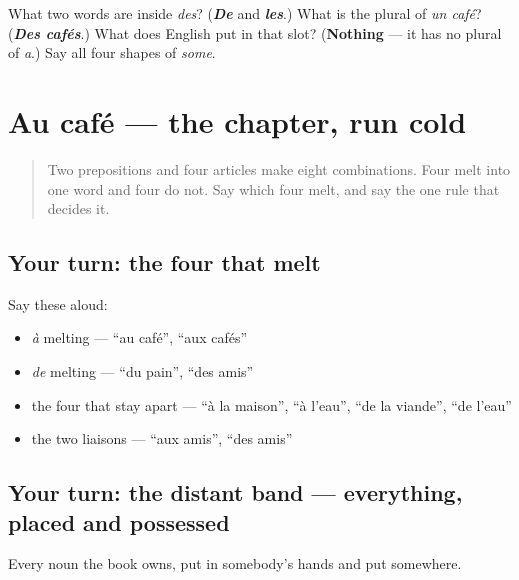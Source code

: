 \begin{tcolorbox}[breakable,colback=teal!4,colframe=teal!35!black,title={Before you move on}]
What two words are inside \emph{des}? (\emph{\textbf{De}} and \emph{\textbf{les}}.) What is the plural of \emph{un café}? (\emph{\textbf{Des cafés}}.) What does English put in that slot? (\textbf{Nothing} — it has no plural of \emph{a}.) Say all four shapes of \emph{some}.
\end{tcolorbox}
\section[Practice]{Au café — the chapter, run cold}

\label{lesson:FR-R35-au-cafe}



\begin{quote}
Two prepositions and four articles make eight combinations. Four melt into one word and four do not. Say which four melt, and say the one rule that decides it.
\end{quote}

\subsection*{Your turn: the four that melt}
Say these aloud:

\begin{itemize}
\raggedright
  \item \emph{à} melting — \textquotedblleft{}au café\textquotedblright{}, \textquotedblleft{}aux cafés\textquotedblright{}
  \item \emph{de} melting — \textquotedblleft{}du pain\textquotedblright{}, \textquotedblleft{}des amis\textquotedblright{}
  \item the four that stay apart — \textquotedblleft{}à la maison\textquotedblright{}, \textquotedblleft{}à l'eau\textquotedblright{}, \textquotedblleft{}de la viande\textquotedblright{}, \textquotedblleft{}de l'eau\textquotedblright{}
  \item the two liaisons — \textquotedblleft{}aux amis\textquotedblright{}, \textquotedblleft{}des amis\textquotedblright{}
\end{itemize}

\subsection*{Your turn: the distant band — everything, placed and possessed}
Every noun the book owns, put in somebody's hands and put somewhere.

